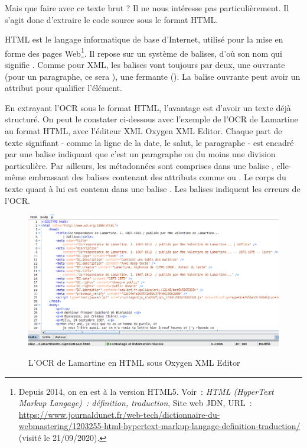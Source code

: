 Mais que faire avec ce texte brut ? Il ne nous intéresse pas particulièrement. Il s'agit donc d'extraire le code source sous le format HTML. 

HTML est le langage informatique de base d'Internet, utilisé pour la mise en forme des pages Web\footnote{Depuis 2014, on en est à la version HTML5. Voir~: \emph{HTML (HyperText Markup Langage)~: définition, traduction}, Site web JDN, URL~: \url{https://www.journaldunet.fr/web-tech/dictionnaire-du-webmastering/1203255-html-hypertext-markup-langage-definition-traduction/} (visité le 21/09/2020).}. Il repose sur un système de balises, d'où son nom qui signifie . 
Comme pour XML, les balises vont toujours par deux, une ouvrante (pour un paragraphe, ce sera ), une fermante ().
 La balise ouvrante peut avoir un attribut pour qualifier l'élément.

En extrayant l'OCR sous le format HTML, l'avantage est d'avoir un texte déjà structuré. On peut le constater ci-dessous avec l'exemple de l'OCR de Lamartine au format HTML, avec l'éditeur XML Oxygen XML Editor. Chaque part de texte signifiant - comme la ligne de la date, le salut, le paragraphe - est encadré par une balise  indiquant que c'est un paragraphe ou du moins une division particulière. Par ailleurs, les métadonnées sont comprises dans une balise , elle-même embrassant des balises  contenant des attributs comme  ou .
Le corps du texte quant à lui est contenu dans une balise . Les balises  indiquent les erreurs de l'OCR.

\begin{figure}[ht]
    \centering
    \caption{L'OCR de Lamartine en HTML sous Oxygen XML Editor}
    \includegraphics[width=16cm]{images/lamartine_html.png}
    \label{lamartine_html}
\end{figure}

